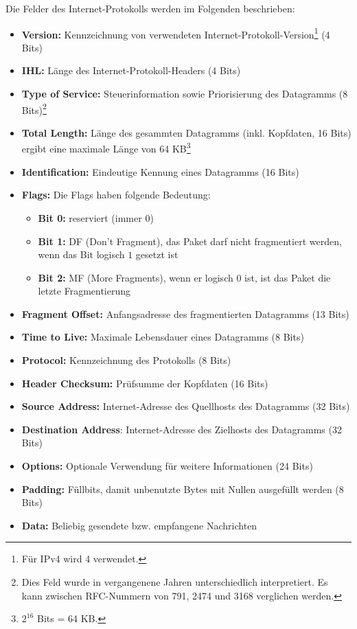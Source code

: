 Die Felder des Internet-Protokolls werden im Folgenden beschrieben:

\begin{itemize}
	\item \textbf{Version:} Kennzeichnung von verwendeten Internet-Protokoll-Version\footnote{Für IPv4 wird 4 verwendet.} (4 Bits)
	\item \textbf{IHL:} Länge des Internet-Protokoll-Headers (4 Bits)
	\item \textbf{Type of Service:} Steuerinformation sowie Priorisierung des Datagramms (8 Bits)\footnote{Dies Feld wurde in vergangenene Jahren unterschiedlich interpretiert. Es kann zwischen RFC-Nummern von 791, 2474 und 3168 verglichen werden.}
	\item \textbf{Total Length:} Länge des gesammten Datagramms (inkl. Kopfdaten, 16 Bits) ergibt eine maximale Länge von 64 KB\footnote{$2^{16}$ Bits = 64 KB.}
	\item \textbf{Identification:} Eindeutige Kennung eines Datagramms (16 Bits)
	\item \textbf{Flags:} Die Flags haben folgende Bedeutung:
		\begin{itemize}
			\item \textbf{Bit 0:} reserviert (immer $0$)
			\item \textbf{Bit 1:} DF (Don't Fragment), das Paket darf nicht fragmentiert werden, wenn das Bit logisch $1$ gesetzt ist
			\item \textbf{Bit 2:} MF (More Fragments), wenn er logisch $0$ ist, ist das Paket die letzte Fragmentierung
		\end{itemize}
	\item \textbf{Fragment Offset:} Anfangsadresse des fragmentierten Datagramms (13 Bits)
	\item \textbf{Time to Live:} Maximale Lebensdauer eines Datagramms (8 Bits)
	\item \textbf{Protocol:} Kennzeichnung des Protokolls (8 Bits)
	\item \textbf{Header Checksum:} Prüfsumme der Kopfdaten (16 Bits)
	\item \textbf{Source Address:} Internet-Adresse des Quellhosts des Datagramms (32 Bits)
	\item \textbf{Destination Address}: Internet-Adresse des Zielhosts des Datagramms (32 Bits)
	\item \textbf{Options:} Optionale Verwendung für weitere Informationen (24 Bits)
	\item \textbf{Padding:} Füllbits, damit unbenutzte Bytes mit Nullen ausgefüllt werden (8 Bits)
	\item \textbf{Data:} Beliebig gesendete bzw. empfangene Nachrichten
\end{itemize}

